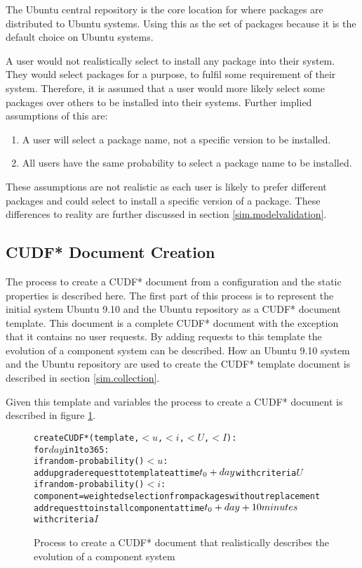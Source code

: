 The Ubuntu central repository is the core location for where packages are distributed to Ubuntu systems.
Using this as the set of packages because it is the default choice on Ubuntu systems.

A user would not realistically select to install any package into their system.
They would select packages for a purpose, to fulfil some requirement of their system.
Therefore, it is assumed that a user would more likely select some packages over others to be installed into their systems.
Further implied assumptions of this are:
\begin{enumerate}
  \item A user will select a package name, not a specific version to be installed.
  \item All users have the same probability to select a package name to be installed. 
\end{enumerate}
These assumptions are not realistic as each user is likely to prefer different packages and could select to install a specific version of a package. 
These differences to reality are further discussed in section \ref{sim.modelvalidation}.

\subsection{CUDF* Document Creation}
The process to create a CUDF* document from a configuration and the static properties is described here.
The first part of this process is to represent the initial system Ubuntu 9.10 and the Ubuntu repository as a CUDF* document template.
This document is a complete CUDF* document with the exception that it contains no user requests.
By adding requests to this template the evolution of a component system can be described.
How an Ubuntu 9.10 system and the Ubuntu repository are used to create the CUDF* template document is described in section \ref{sim.collection}.

Given this template and \usermodel variables the process to create a CUDF* document is described in figure \ref{sim.CUDF*}.
\begin{figure}[h]
\begin{center}
\begin{alltt}
createCUDF*(template, \(< u\), \(< i\), \(< U\), \(< I\)):
  for \(day\) in 1 to 365:
    if random-probability() \(< u\):
      add upgrade request to template at time \(t\sb{0}+day\) with criteria \(U\)
    if random-probability() \(< i\):  
      component = weighted selection from packages without replacement 
      add request to install component at time \(t\sb{0}+day+10 minutes\) 
                                                      with criteria \(I\)
\end{alltt}
  \caption{Process to create a CUDF* document that realistically describes the evolution of a component system}
  \label{sim.CUDF*}
\end{center}
\end{figure}

